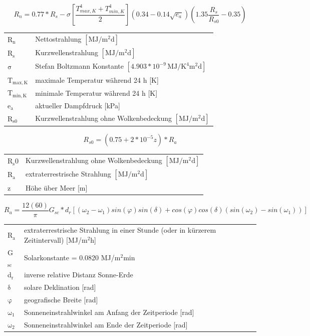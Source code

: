 \begin{description}
\begin{equation}
\label{eq:rn}
R_n=0.77*R_s-\sigma\left[\frac{T_{max,K}^4+T_{min,K}^4}{2}\right]\left(0.34-0.14\sqrt{e_a}\right)\left(1.35\frac{R_s}{R_{s0}}-0.35\right)
\end{equation}
\begin{table}[H]
\centering
\begin{tabular}{ll}
$\mathrm{R_n}$ & Nettostrahlung $\mathrm{[MJ/m^2d]}$ \\
$\mathrm{R_s}$ & Kurzwellenstrahlung $\mathrm{[MJ/m^2d]}$ \\
$\mathrm{\sigma}$ & Stefan Boltzmann Konstante $\mathrm{[4.903*10^{-9}\,MJ/K^4m^2d]}$\\
$\mathrm{T_{max,K}}$ & maximale Temperatur während 24 h [K]\\
$\mathrm{T_{min,K}}$ & minimale Temperatur während 24 h [K]\\
$\mathrm{e_a}$ & aktueller Dampfdruck [kPa]\\
$\mathrm{R_{s0}}$ & Kurzwellenstrahlung ohne Wolkenbedeckung $\mathrm{[MJ/m^2d]}$\\
\end{tabular}
\end{table}

\begin{equation}
\label{eq:rs0}
R_{s0}=\left(0.75+2*10^{-5}z\right)*R_a
\end{equation}
\begin{table}[H]
\centering
\begin{tabular}{ll}
$\mathrm{R_s0}$ & Kurzwellenstrahlung ohne Wolkenbedeckung $\mathrm{[MJ/m^2d]}$\\
$\mathrm{R_a}$ & extraterrestrische Strahlung $\mathrm{[MJ/m^2d]}$ \\
z & Höhe über Meer [m]\\
\end{tabular}
\end{table}

\begin{equation}
\label{eq:Ra_short_period}
R_{a}=\frac{12 (60)}{\pi}G_{sc}*d_{r}[(\omega _{2}-\omega _{1})sin(\varphi)sin(\delta)+cos(\varphi)cos(\delta)(sin(\omega _{2})- sin(\omega _{1}))]
\end{equation}
\begin{table}[H]
\centering
\begin{tabular}{ll}
R$\mathrm{_{a}}$ & extraterrestrische Strahlung in einer Stunde (oder in kürzerem Zeitintervall) [MJ/m$\mathrm{^{2}}$h]\\
G$\mathrm{_{sc}}$ & Solarkonstante = 0.0820 MJ/m$\mathrm{^{2}}$min\\
d$\mathrm{_{r}}$ & inverse relative Distanz Sonne-Erde\\
$\mathrm{\delta}$ & solare Deklination [rad]\\
$\mathrm{\varphi}$ & geografische Breite [rad]\\
$\mathrm{\omega_{1}}$ & Sonneneinstrahlwinkel am Anfang der Zeitperiode [rad]\\
$\mathrm{\omega_{2}}$ & Sonneneinstrahlwinkel am Ende der Zeitperiode [rad]\\
\end{tabular}
\end{table}


\end{description}
